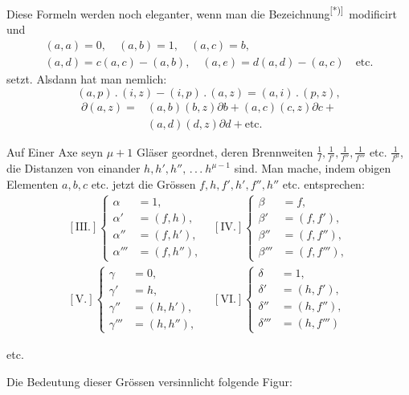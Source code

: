 \clearpage{}
Diese Formeln werden noch eleganter, wenn man die Bezeichnung\textsuperscript{[*)]}\begingroup\renewcommand{\thefootnote}{}\endgroup\ modificirt und
\[
\begin{gathered}
(a,a)=0,\quad (a,b)=1,\quad (a,c)=b,\\
(a,d)=c(a,c)-(a,b),\quad (a,e)=d(a,d)-(a,c)\quad\text{etc.}
\end{gathered}
\]
\noindent setzt. Alsdann hat man nemlich:
\begin{equation}
(a,p)\mathbin{.}(i,z)-(i,p)\mathbin{.}(a,z)=(a,i)\mathbin{.}(p,z),
\tag*{I[a].}
\end{equation}
\begin{equation}
\begin{aligned}
\partial(a,z)={}&(a,b)(b,z)\partial b+(a,c)(c,z)\partial c\mathbin{+}{}\\
& (a,d)(d,z)\partial d+\text{etc.}
\end{aligned}
\tag*{II[a].}
\end{equation}

Auf Einer Axe seyn $\mu+1$ Gläser geordnet, deren Brennweiten $\frac{1}{f},\frac{1}{f'},\frac{1}{f''},\frac{1}{f'''}$ etc. $\frac{1}{f^\mu}$, die Distanzen von einander $h,h',h'',\, .\, .\, .\ h^{\mu-1}$ sind. Man mache, indem obigen Elementen $a,b,c$ etc. jetzt die Grössen $f,h,f',h',f'',h''$ etc. entsprechen:
\[
\begin{array}{cc}
[\mathrm{III.}]\left\{\begin{aligned}
\alpha&=1,\\ \alpha'&=(f,h),\\ \alpha''&=(f,h'),\\ \alpha'''&=(f,h''),
\end{aligned}\right.
&[\mathrm{IV.}]\left\{\begin{aligned}
\beta&=f,\\ \beta'&=(f,f'),\\ \beta''&=(f,f''),\\ \beta'''&=(f,f'''),
\end{aligned}\right.\\[1em]
{}[\mathrm{V.}]\left\{\begin{aligned}
\gamma&=0,\\ \gamma'&=h,\\ \gamma''&=(h,h'),\\ \gamma'''&=(h,h''),
\end{aligned}\right.
&[\mathrm{VI.}]\left\{\begin{aligned}
\delta&=1,\\ \delta'&=(h,f'),\\ \delta''&=(h,f''),\\ \delta'''&=(h,f''')
\end{aligned}\right.
\end{array}
\]
\begin{center}etc.\end{center}
\noindent\hspace*{\parindent}Die Bedeutung dieser Grössen versinnlicht folgende Figur:


